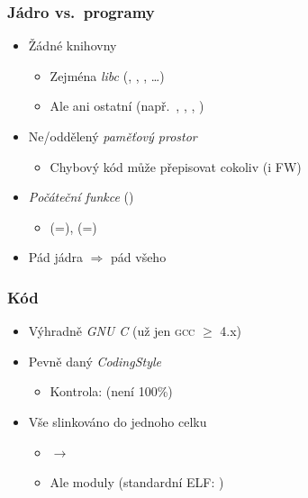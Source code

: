 \begin{frame}
  \frametitle{Jádro vs.\ programy}

  \begin{itemize}
    \item Žádné knihovny
    \begin{itemize}
      \item Zejména \emph{libc} (, , ,
	\dots)

      \pause

      \item Ale ani ostatní (např.\ , , ,
	)
    \end{itemize}

    \pause

    \item Ne/oddělený \emph{paměťový prostor}
    \begin{itemize}
      \item Chybový kód může přepisovat cokoliv (i FW)
    \end{itemize}

    \pause

    \item \emph{Počáteční funkce} ()
    \begin{itemize}
      \item {} (=), 
	(=)
    \end{itemize}

    \pause

    \item Pád jádra $\Rightarrow$ pád všeho

  \end{itemize}
\end{frame}

\begin{frame}
  \frametitle{Kód}

  \begin{itemize}
    \item Výhradně \emph{GNU C} (\xes už jen \textsc{gcc} $\geq$ 4.x)

    \pause

    \item Pevně daný \emph{CodingStyle}
    \begin{itemize}
      \item Kontrola:  (není 100\%)
    \end{itemize}

    \pause

    \item Vše slinkováno do jednoho celku
    \begin{itemize}
      \item {} $\rightarrow$ 
      \item Ale moduly (standardní ELF: )
    \end{itemize}
  \end{itemize}

\end{frame}

